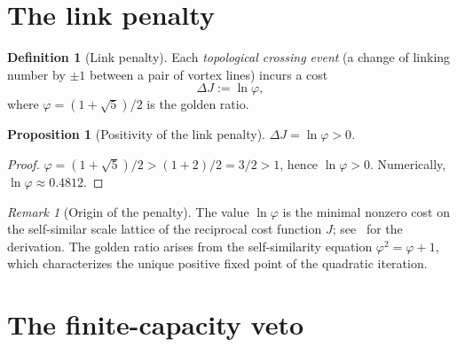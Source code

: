 \documentclass[11pt]{amsart}
\newtheorem{proposition}[theorem]{Proposition}
\theoremstyle{definition}
\newtheorem{definition}[theorem]{Definition}
\theoremstyle{remark}
\newtheorem{remark}[theorem]{Remark}
\begin{document}
\section{The link penalty}\label{sec:penalty}

\begin{definition}[Link penalty]\label{def:penalty}
Each \emph{topological crossing event} (a change of linking number by
$\pm 1$ between a pair of vortex lines) incurs a cost
\[
\Delta J:=\ln\varphi,
\]
where $\varphi=(1+\sqrt{5})/2$ is the golden ratio.
\end{definition}

\begin{proposition}[Positivity of the link penalty]\label{prop:penalty-pos}
$\Delta J=\ln\varphi>0$.
\end{proposition}
\begin{proof}
$\varphi=(1+\sqrt5)/2>(1+2)/2=3/2>1$, hence $\ln\varphi>0$.
Numerically, $\ln\varphi\approx 0.4812$.
\end{proof}

\begin{remark}[Origin of the penalty]
The value $\ln\varphi$ is the minimal nonzero cost on the self-similar
scale lattice of the reciprocal cost function $J$;
see~\cite[Definition~6.2 and Proposition~6.3]{F1} for the derivation.
The golden ratio arises from the self-similarity equation
$\varphi^2=\varphi+1$, which characterizes the unique positive
fixed point of the quadratic iteration.
\end{remark}

\section{The finite-capacity veto}\label{sec:veto}
\end{document}
